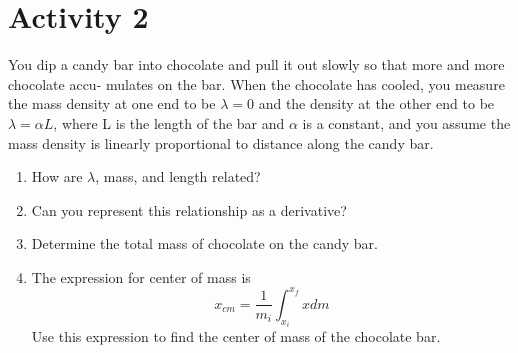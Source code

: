 \documentclass[]{article}
\newcommand{\excerpt}[1]{\colorbox{lightgray}{\parbox{14.8cm}{#1}} \\}
\begin{document}
\section*{Activity 2}%
You dip a candy bar into chocolate and pull it out slowly so that more and more chocolate accu- mulates on the bar. When the chocolate has cooled, you measure the mass density at one end to be $\lambda = 0$ and the density at the other end to be $\lambda = \alpha L$, where L is the length of the bar and $\alpha$ is a constant, and you assume the mass density is linearly proportional to distance along the candy bar.
\begin{enumerate}
	\item How are $\lambda$, mass, and length related?
	\item Can you represent this relationship as a derivative?
	\item Determine the total mass of chocolate on the candy bar.
	\item The expression for center of mass is 
	\begin{equation}
		x_{cm} = \frac{1}{m_i}\int_{x_i}^{x_f} x dm
	\end{equation}
	Use this expression to find the center of mass of the chocolate bar.
\end{enumerate}
\iffalse
\excerpt{You dip a candy bar into chocolate and pull it out slowly so that more and more chocolate accu- mulates on the bar. When the chocolate has cooled, you measure the mass density at one end to be $\lambda = 0$ and the density at the other end to be $\lambda = \alpha L$, where L is the length of the bar and $\alpha$ is a constant, and you assume the mass density is linearly proportional to distance along the candy bar.}
\vspace{50mm}
\excerpt{(a) How are $\lambda$, mass, and length related?}
\vspace{50mm}
\phantom{\parbox{\textwidth}{}}
\excerpt{(b) Can you represent this relationship as a derivative?}
\vspace{50mm}
\phantom{\parbox{\textwidth}{}}
\excerpt{(c) Determine the total mass of chocolate on the candy bar.}
\vspace{50mm}
\phantom{\parbox{\textwidth}{}}
\excerpt{(d) The expression for center of mass is 
\begin{equation}
	x_{cm} = \frac{1}{m_i}\int_{x_i}^{x_f} x dm
\end{equation}
Use this expression to find the center of mass of the chocolate bar.
}
\phantom{\parbox{\textwidth}{}}
\fi
\end{document}
